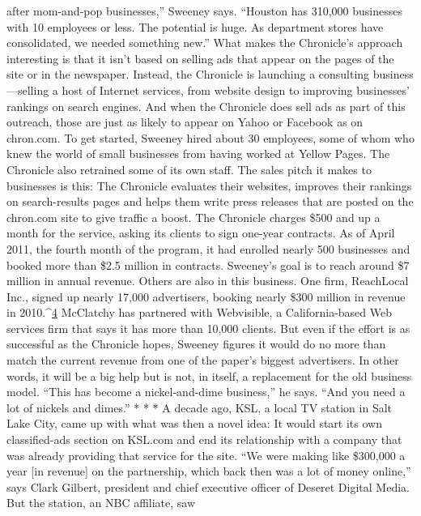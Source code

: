 after mom-and-pop businesses,'' Sweeney says. ``Houston has 310,000 businesses
with 10 employees or less. The potential is huge. As department stores have consolidated,
we needed something new.''
What makes the Chronicle's approach interesting is that it isn't based on selling
ads that appear on the pages of the site or in the newspaper. Instead, the
Chronicle is launching a consulting business—selling a host of Internet services,
from website design to improving businesses' rankings on search engines. And
when the Chronicle does sell ads as part of this outreach, those are just as likely
to appear on Yahoo or Facebook as on chron.com.
To get started, Sweeney hired about 30 employees, some of whom who knew
the world of small businesses from having worked at Yellow Pages. The Chronicle
also retrained some of its own staff. The sales pitch it makes to businesses is this:
The Chronicle evaluates their websites, improves their rankings on search-results
pages and helps them write press releases that are posted on the chron.com site
to give traffic a boost.
The Chronicle charges \$500 and up a month for the service, asking its clients
to sign one-year contracts. As of April 2011, the fourth month of the program, it
had enrolled nearly 500 businesses and booked more than \$2.5 million in contracts.
Sweeney's goal is to reach around \$7 million in annual revenue.
Others are also in this business. One firm, ReachLocal Inc., signed up nearly
17,000 advertisers, booking nearly \$300 million in revenue in 2010.^{\href{#endnotes-chapter-8}{4}} McClatchy
has partnered with Webvisible, a California-based Web services firm that says it
has more than 10,000 clients.
But even if the effort is as successful as the Chronicle hopes, Sweeney figures it
would do no more than match the current revenue from one of the paper's biggest
advertisers. In other words, it will be a big help but is not, in itself, a replacement
for the old business model. ``This has become a nickel-and-dime business,''
he says. ``And you need a lot of nickels and dimes.''
* * *
A decade ago, KSL, a local TV station in Salt Lake City, came up with what
was then a novel idea: It would start its own classified-ads section on KSL.com
and end its relationship with a company that was already providing that service
for the site.
``We were making like \$300,000 a year [in revenue] on the partnership, which
back then was a lot of money online,'' says Clark Gilbert, president and chief
executive officer of Deseret Digital Media. But the station, an NBC affiliate, saw
